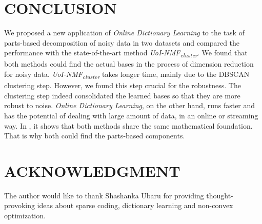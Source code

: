 \documentclass[conference]{IEEEtran}
\begin{document}
\section{CONCLUSION}

We proposed a new application of \textit{Online Dictionary Learning} to the task of parts-based decomposition of noisy data in two datasets and compared the performance with the state-of-the-art method \textit{UoI-NMF\textsubscript{cluster}}. We found that both methods could find the actual bases in the process of dimension reduction for noisy data. \textit{UoI-NMF\textsubscript{cluster}} takes longer time, mainly due to the DBSCAN clustering step. However, we found this step crucial for the robustness. The clustering step indeed consolidated the learned bases so that they are more robust to noise. \textit{Online Dictionary Learning}, on the other hand, runs faster and has the potential of dealing with large amount of data, in an online or streaming way. In \cite{b12}, it shows that both methods share the same mathematical foundation. That is why both could find the parts-based components.

\section{ACKNOWLEDGMENT}

The author would like to thank Shashanka Ubaru for providing thought-provoking ideas about sparse coding, dictionary learning and non-convex optimization.
\end{document}
